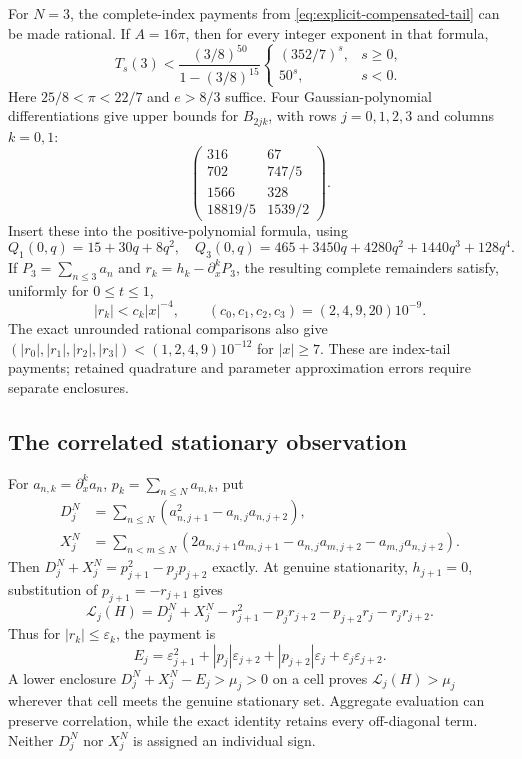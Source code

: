 \documentclass[11pt]{article}
\numberwithin{equation}{section}
\theoremstyle{definition}
\theoremstyle{remark}
\newcommand{\Lag}{\mathscr L}
\begin{document}
For \(N=3\), the complete-index payments from
\eqref{eq:explicit-compensated-tail} can be made rational. If
\(A=16\pi\), then for every integer exponent in that formula,
\[
 T_s(3)<\frac{(3/8)^{50}}{1-(3/8)^{15}}
 \begin{cases}(352/7)^s,&s\ge0,\\50^s,&s<0.\end{cases}
\]
Here \(25/8<\pi<22/7\) and \(e>8/3\) suffice.
Four Gaussian-polynomial differentiations give upper bounds for
\(B_{2jk}\), with rows \(j=0,1,2,3\) and columns \(k=0,1\):
\[
 \begin{pmatrix}
 316&67\\702&747/5\\1566&328\\18819/5&1539/2
 \end{pmatrix}.
\]
Insert these into the positive-polynomial formula, using
\[
 Q_1(0,q)=15+30q+8q^2,\quad
 Q_3(0,q)=465+3450q+4280q^2+1440q^3+128q^4.
\]
If \(P_3=\sum_{n\le3}a_n\) and \(r_k=h_k-\partial_x^kP_3\),
the resulting complete remainders satisfy, uniformly for \(0\le t\le1\),
\begin{equation}
 |r_k|<c_k|x|^{-4},\qquad
 (c_0,c_1,c_2,c_3)=(2,4,9,20)10^{-9}.
 \label{eq:rational-four-jet-payment}
\end{equation}
The exact unrounded rational comparisons also give
\((|r_0|,|r_1|,|r_2|,|r_3|)<(1,2,4,9)10^{-12}\) for \(|x|\ge7\).
These are index-tail payments; retained quadrature and parameter
approximation errors require separate enclosures.

\subsection{The correlated stationary observation}
\label{sec:correlated-stationary}

For \(a_{n,k}=\partial_x^ka_n\), \(p_k=\sum_{n\le N}a_{n,k}\), put
\begin{align*}
 D_j^N&=\sum_{n\le N}(a_{n,j+1}^2-a_{n,j}a_{n,j+2}),\\
 X_j^N&=\sum_{n<m\le N}
 (2a_{n,j+1}a_{m,j+1}-a_{n,j}a_{m,j+2}-a_{m,j}a_{n,j+2}).
\end{align*}
Then \(D_j^N+X_j^N=p_{j+1}^2-p_jp_{j+2}\) exactly.
At genuine stationarity, \(h_{j+1}=0\), substitution of
\(p_{j+1}=-r_{j+1}\) gives
\begin{equation}
 \Lag_j(H)=D_j^N+X_j^N-r_{j+1}^2
 -p_jr_{j+2}-p_{j+2}r_j-r_jr_{j+2}.
 \label{eq:genuine-stationary-compensation}
\end{equation}
Thus for \(|r_k|\le\varepsilon_k\), the payment is
\begin{equation}
 E_j=\varepsilon_{j+1}^2+|p_j|\varepsilon_{j+2}
 +|p_{j+2}|\varepsilon_j+\varepsilon_j\varepsilon_{j+2}.
 \label{eq:stationary-error-payment}
\end{equation}
A lower enclosure \(D_j^N+X_j^N-E_j>\mu_j>0\) on a cell
proves \(\Lag_j(H)>\mu_j\) wherever that cell meets the genuine
stationary set. Aggregate evaluation can preserve correlation, while
the exact identity retains every off-diagonal term. Neither \(D_j^N\)
nor \(X_j^N\) is assigned an individual sign.
\end{document}
